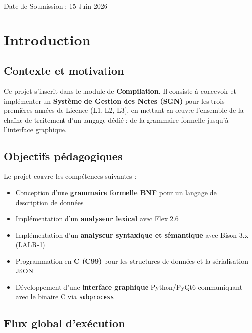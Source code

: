 \documentclass[10pt,a4paper]{article}
\begin{document}
\begin{titlepage}
  \vfill

  \begin{flushleft}
    {\normalsize Date de Soumission : 15 Juin 2026\par}
  \end{flushleft}

\end{titlepage}

\tableofcontents
\newpage

\section{Introduction}

\subsection{Contexte et motivation}

Ce projet s'inscrit dans le module de \textbf{Compilation}.
Il consiste à concevoir et implémenter un \textbf{Système de Gestion des Notes (SGN)}
pour les trois premières années de Licence (L1, L2, L3), en mettant en œuvre l'ensemble
de la chaîne de traitement d'un langage dédié : de la grammaire formelle jusqu'à l'interface
graphique.

\subsection{Objectifs pédagogiques}

Le projet couvre les compétences suivantes :

\begin{itemize}
  \item Conception d'une \textbf{grammaire formelle BNF} pour un langage de description de données
  \item Implémentation d'un \textbf{analyseur lexical} avec Flex 2.6
  \item Implémentation d'un \textbf{analyseur syntaxique et sémantique} avec Bison 3.x (LALR-1)
  \item Programmation en \textbf{C (C99)} pour les structures de données et la sérialisation JSON
  \item Développement d'une \textbf{interface graphique} Python/PyQt6 communiquant avec le binaire C via \texttt{subprocess}
\end{itemize}

\subsection{Flux global d'exécution}
\end{document}

